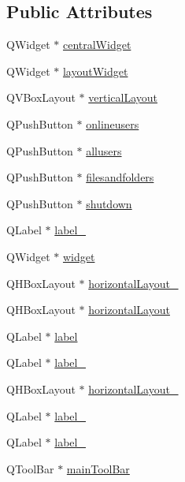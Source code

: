 \subsection*{Public Attributes}
\begin{DoxyCompactItemize}
\item 
Q\-Widget $\ast$ \hyperlink{classUi__server_a0e286bf6515d46d0ce1eaf6b631bd145}{central\-Widget}
\item 
Q\-Widget $\ast$ \hyperlink{classUi__server_acbe86c97737f33c2e859d281a53a6d28}{layout\-Widget}
\item 
Q\-V\-Box\-Layout $\ast$ \hyperlink{classUi__server_acf9b7150d040d4ec4d85a266e891a0e4}{vertical\-Layout}
\item 
Q\-Push\-Button $\ast$ \hyperlink{classUi__server_a6cf0e7a5f9ce8b31e1f93486ba5d9ea6}{onlineusers}
\item 
Q\-Push\-Button $\ast$ \hyperlink{classUi__server_aa6b96658250a8b72faca552f0be913d8}{allusers}
\item 
Q\-Push\-Button $\ast$ \hyperlink{classUi__server_ad362cc1da064ad825926d87bf6644276}{filesandfolders}
\item 
Q\-Push\-Button $\ast$ \hyperlink{classUi__server_a0f1b7d53eeacb675dd2183cfaacdbb78}{shutdown}
\item 
Q\-Label $\ast$ \hyperlink{classUi__server_ad1ff674e2e2f9e112f3fdb85bf64bf2c}{label\-\_}
\item 
Q\-Widget $\ast$ \hyperlink{classUi__server_ace92325e6495e01222226b9ad85a0dfe}{widget}
\item 
Q\-H\-Box\-Layout $\ast$ \hyperlink{classUi__server_aa46f2b9b91e96c997795f67d35120289}{horizontal\-Layout\-\_}
\item 
Q\-H\-Box\-Layout $\ast$ \hyperlink{classUi__server_a11a951ba853e0f94d57704a76088ce54}{horizontal\-Layout}
\item 
Q\-Label $\ast$ \hyperlink{classUi__server_a965352bb6187d932f0fada586670e6b8}{label}
\item 
Q\-Label $\ast$ \hyperlink{classUi__server_a58fc60a6778156dd9d740d0306805bed}{label\-\_}
\item 
Q\-H\-Box\-Layout $\ast$ \hyperlink{classUi__server_a236a5c76ab01aa3a54fc1c7f87dbd2e6}{horizontal\-Layout\-\_}
\item 
Q\-Label $\ast$ \hyperlink{classUi__server_a9f0a4034a058c8cb337d3bf29175076c}{label\-\_}
\item 
Q\-Label $\ast$ \hyperlink{classUi__server_aabf48ff690d1ceff2eaf6f0b6ca06007}{label\-\_}
\item 
Q\-Tool\-Bar $\ast$ \hyperlink{classUi__server_a4d8409dd8c0f5c193382003e11b7447b}{main\-Tool\-Bar}
\end{DoxyCompactItemize}


